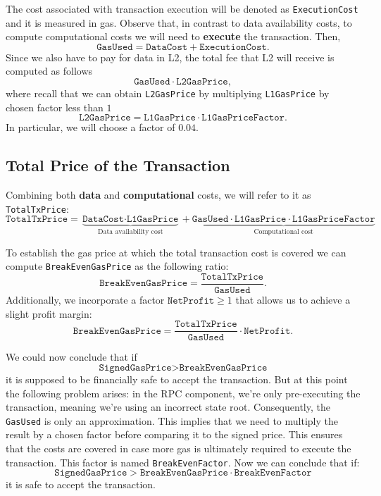 The cost associated with transaction execution will be denoted as \texttt{ExecutionCost} and it is measured in gas. Observe that, in contrast to data availability costs, to compute computational costs we will need to \textbf{execute} the transaction. Then,
\[
\texttt{GasUsed} = \texttt{DataCost} + \texttt{ExecutionCost}.
\]
Since we also have to pay for data in L2, the total fee that L2 will receive is computed as follows
\[
\texttt{GasUsed} \cdot \texttt{L2GasPrice},
\]
where recall that we can obtain \texttt{L2GasPrice} by multiplying \texttt{L1GasPrice} by chosen factor less than $1$
\[
\texttt{L2GasPrice} = \texttt{L1GasPrice} \cdot \texttt{L1GasPriceFactor}.
\]
In particular, we will choose a factor of $0.04$.



\subsection{Total Price of the Transaction}

Combining both \textbf{data} and \textbf{computational} costs, we will refer to it as \texttt{TotalTxPrice}:
\[
\texttt{TotalTxPrice} = \underbrace{\texttt{DataCost} \cdot \texttt{L1GasPrice}}_\text{Data availability cost} + \underbrace{\texttt{GasUsed} \cdot \texttt{L1GasPrice} \cdot \texttt{L1GasPriceFactor}}_\text{Computational cost}
\]

To establish the gas price at which the total transaction cost is covered we can compute \texttt{BreakEvenGasPrice} as the following ratio:
\[
\texttt{BreakEvenGasPrice} = \frac{\texttt{TotalTxPrice}}{\texttt{GasUsed}}.
\]
Additionally, we incorporate a factor $\texttt{NetProfit} \geq 1$ that allows us to achieve a slight profit margin:
\[
\texttt{BreakEvenGasPrice} = \frac{\texttt{TotalTxPrice}}{\texttt{GasUsed}} \cdot \texttt{NetProfit}.
\]

We could now conclude that if
\[
\texttt{SignedGasPrice} > \texttt{BreakEvenGasPrice}
\]
it is supposed to be financially safe to accept the transaction. But at this point the following problem arises: in the RPC component, we're only pre-executing the transaction, meaning we're using an incorrect state root. Consequently, the \texttt{GasUsed} is only an approximation. This implies that we need to multiply the result by a chosen factor before comparing it to the signed price. This ensures that the costs are covered in case more gas is ultimately required to execute the transaction. This factor is named \texttt{BreakEvenFactor}. Now we can conclude that if:
\[
\texttt{SignedGasPrice} > \texttt{BreakEvenGasPrice} \cdot \texttt{BreakEvenFactor}
\]
it is safe to accept the transaction.

